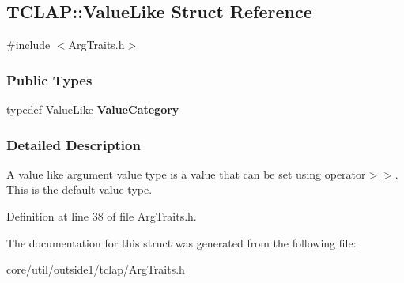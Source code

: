 \hypertarget{structTCLAP_1_1ValueLike}{}\subsection{T\+C\+L\+AP\+:\+:Value\+Like Struct Reference}
\label{structTCLAP_1_1ValueLike}


{\ttfamily \#include $<$Arg\+Traits.\+h$>$}

\subsubsection*{Public Types}
\begin{DoxyCompactItemize}
\item 
typedef \hyperlink{structTCLAP_1_1ValueLike}{Value\+Like} {\bfseries Value\+Category}\hypertarget{structTCLAP_1_1ValueLike_a26e6d3b8c4a608ecebe7404e42fbecf9}{}\label{structTCLAP_1_1ValueLike_a26e6d3b8c4a608ecebe7404e42fbecf9}

\end{DoxyCompactItemize}


\subsubsection{Detailed Description}
A value like argument value type is a value that can be set using operator$>$$>$. This is the default value type. 

Definition at line 38 of file Arg\+Traits.\+h.



The documentation for this struct was generated from the following file\+:\begin{DoxyCompactItemize}
\item 
core/util/outside1/tclap/Arg\+Traits.\+h\end{DoxyCompactItemize}
